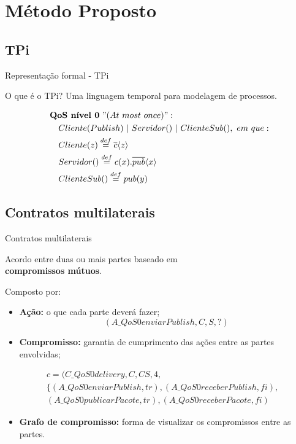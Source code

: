 \documentclass[12pt,xcolor={usenames,dvipsnames}]{beamer}
\begin{document}
\section{Método Proposto}
\subsection{TPi}
\begin{frame}{Representação formal - TPi}
\begin{beamerboxesrounded}{O que é o TPi?}
	Uma linguagem temporal para modelagem de processos.
\end{beamerboxesrounded}
\begin{align}
&\textbf{QoS~nível~0}~"(At~most~once)":~ \nonumber \\
&\quad Cliente(Publish)~|~Servidor()~|~ClienteSub(),~em~que: \nonumber \\
&\quad Cliente(z) \stackrel{def}{=} \overline{c}\langle z \rangle \nonumber \\
&\quad Servidor() \stackrel{def}{=} c(x).\overline{pub}\langle x \rangle \nonumber \\
&\quad ClienteSub() \stackrel{def}{=} pub(y) \nonumber
\end{align}      
\end{frame}

\subsection{Contratos multilaterais}
\begin{frame}{Contratos multilaterais}
\begin{beamerboxesrounded}{}
	Acordo entre duas ou mais partes baseado em\\ \textbf{compromissos mútuos}.
\end{beamerboxesrounded}
Composto por:
\begin{itemize}
	\item \textbf{Ação:} o que cada parte deverá fazer;
	$$(A\_QoS0enviarPublish, C, S, ?)$$
	\item \textbf{Compromisso:} garantia de cumprimento das ações entre as partes envolvidas;
\end{itemize}	
	\begin{align}
	& c = (C\_QoS0delivery,C,CS,4, \nonumber \\
	& \{ (A\_QoS0enviarPublish,tr), (A\_QoS0receberPublish,fi), \nonumber \\
	& (A\_QoS0publicarPacote,tr), (A\_QoS0receberPacote,fi) \nonumber
	\end{align}
\begin{itemize}	
	\item \textbf{Grafo de compromisso:} forma de visualizar os compromissos entre as partes.
\end{itemize}
\end{frame}
\end{document}
